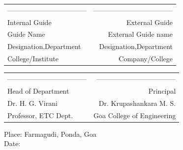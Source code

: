 \vspace{0.3cm}
\begin{table}[H]
\begin{tabular}{lr}
\noindent ----------------------------------- & \hspace{6cm} ----------------------------------- \\
Internal Guide & External Guide\\
Guide Name & External Guide name\\
Designation,Department & Designation,Department\\
College/Institute & Company/College\\
\end{tabular}
\end{table}




\begin{table}[H]
\begin{tabular}{lr}
\noindent ----------------------------------- & \hspace{6cm} ----------------------------------- \\
Head of Department & Principal\\
Dr. H. G. Virani & Dr. Krupashankara M. S.\\
Professor, ETC Dept. & Goa College of Engineering\\
\end{tabular}
\end{table}
\vspace{-0.5cm}
\noindent Place: Farmagudi, Ponda, Goa\\
\noindent Date: 